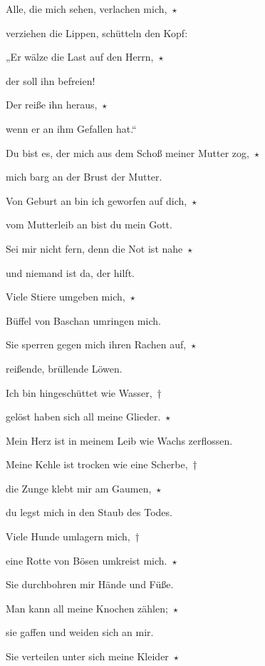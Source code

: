 \noindent Alle, die mich sehen, verlachen mich,~$\star$~\nopagebreak

verziehen die Lippen, schütteln den Kopf:
 
\noindent „Er wälze die Last auf den Herrn,~$\star$~\nopagebreak

der soll ihn befreien! 
 
\noindent Der reiße ihn heraus,~$\star$~\nopagebreak

wenn er an ihm Gefallen hat.“
 
\noindent Du bist es, der mich aus dem Schoß meiner Mutter zog,~$\star$~\nopagebreak

mich barg an der Brust der Mutter.
 
\noindent Von Geburt an bin ich geworfen auf dich,~$\star$~\nopagebreak

vom Mutterleib an bist du mein Gott.
 
\noindent Sei mir nicht fern, denn die Not ist nahe~$\star$~\nopagebreak

und niemand ist da, der hilft.
 
\noindent Viele Stiere umgeben mich,~$\star$~\nopagebreak

Büffel von Baschan umringen mich.
 
\noindent Sie sperren gegen mich ihren Rachen auf,~$\star$~\nopagebreak

reißende, brüllende Löwen.
 
\noindent Ich bin hingeschüttet wie Wasser,~†~\nopagebreak

gelöst haben sich all meine Glieder.~$\star$~\nopagebreak

Mein Herz ist in meinem Leib wie Wachs zerflossen.
 
\noindent Meine Kehle ist trocken wie eine Scherbe,~†~\nopagebreak

die Zunge klebt mir am Gaumen,~$\star$~\nopagebreak

du legst mich in den Staub des Todes.
 
\noindent Viele Hunde umlagern mich,~†~\nopagebreak

eine Rotte von Bösen umkreist mich.~$\star$~\nopagebreak

Sie durchbohren mir Hände und Füße.
 
\noindent Man kann all meine Knochen zählen;~$\star$~\nopagebreak

sie gaffen und weiden sich an mir.
 
\noindent Sie verteilen unter sich meine Kleider~$\star$~\nopagebreak

